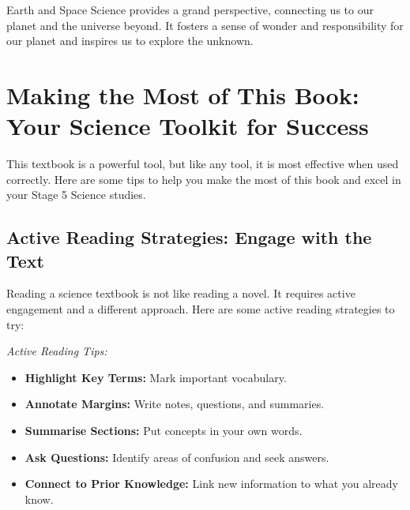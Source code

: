 Earth and Space Science provides a grand perspective, connecting us to our planet and the universe beyond.  It fosters a sense of wonder and responsibility for our planet and inspires us to explore the unknown.

\FloatBarrier

\section{Making the Most of This Book: Your Science Toolkit for Success}

This textbook is a powerful tool, but like any tool, it is most effective when used correctly.  Here are some tips to help you make the most of this book and excel in your Stage 5 Science studies.

\subsection{Active Reading Strategies: Engage with the Text}

Reading a science textbook is not like reading a novel.  It requires active engagement and a different approach.  Here are some active reading strategies to try:

\begin{marginnote}
\textit{Active Reading Tips:}
\begin{itemize}
    \item \textbf{Highlight Key Terms:}  Mark important vocabulary.
    \item \textbf{Annotate Margins:}  Write notes, questions, and summaries.
    \item \textbf{Summarise Sections:}  Put concepts in your own words.
    \item \textbf{Ask Questions:}  Identify areas of confusion and seek answers.
    \item \textbf{Connect to Prior Knowledge:}  Link new information to what you already know.
\end{itemize}
\end{marginnote}


